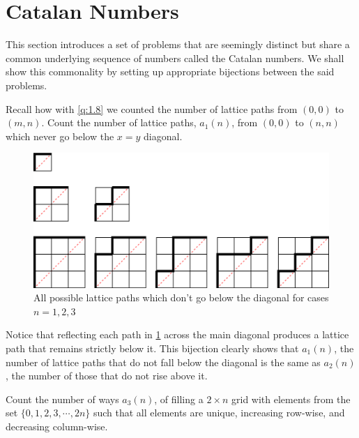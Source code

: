 \section{Catalan Numbers}
This section introduces a set of problems that are seemingly distinct but share a common underlying sequence of numbers called the Catalan numbers. We shall show this commonality by setting up appropriate bijections between the said problems. 
\begin{question}
Recall how with \cref{q:1.8} we counted the number of lattice paths from $(0,0)$ to $(m,n)$. Count the number of lattice paths, $a_1(n)$, from $(0,0)$ to $(n,n)$ which never go below the $x=y$ diagonal.
\end{question}
\begin{figure}[H]
    \centering
\includegraphics[width=0.8\linewidth]{Images/Figure11.png}
    \caption{All possible lattice paths which don't go below the diagonal for cases $n=1,2,3$}
    \label{f:3.21}
\end{figure}    
\begin{remark}
Notice that reflecting each path in \cref{f:3.21} across the main diagonal produces a lattice path that remains strictly below it. This bijection clearly shows that $a_1(n)$, the number of lattice paths that do not fall below the diagonal is the same as $a_2(n)$, the number of those that do not rise above it.
\end{remark}
\begin{question}
Count the number of ways $a_3(n)$, of filling a $2\times n$ grid with elements from the set $\{0,1,2,3,\cdots,2n\}$ such that all elements are unique, increasing row-wise, and decreasing column-wise.
\end{question}

